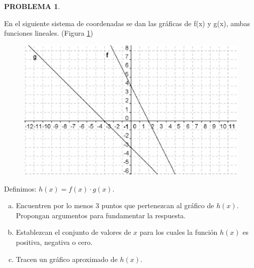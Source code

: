 \documentclass[oneside,spanish]{amsart}
\numberwithin{equation}{section}
\numberwithin{figure}{section}
\theoremstyle{definition}
\newtheorem{problema}{\normalfont PROBLEMA}
\begin{document}
\begin{problema}\label{prob:2}

En el siguiente sistema de coordenadas se dan las gráficas de f(x) y g(x), ambas funciones lineales. (Figura \ref{fig:imagen2})

\begin{figure}[h]
	\centering
	\caption{}
	\label{fig:imagen2}
	\includegraphics[width=0.7\linewidth]{Anexos-03/Imagen2}
\end{figure}

Definimos: $h(x) = f(x) \cdot g(x)$.

\begin{enumerate}[a.]
	\item Encuentren por lo menos 3 puntos que pertenezcan al gráfico de $h(x)$. Propongan argumentos para fundamentar la respuesta.
	\item Establezcan el conjunto de valores de $x$ para los cuales la función $h(x)$ es positiva, negativa o cero.
	\item Tracen un gráfico aproximado de $h(x)$.
\end{enumerate}
\end{problema}
\end{document}
